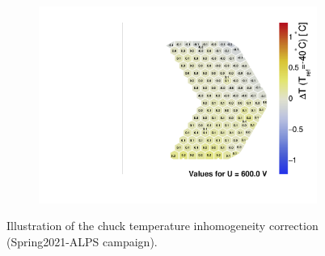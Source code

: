 \begin{figure}
\begin{subfigure}[b]{0.32\textwidth}
		\includegraphics[width=0.999\textwidth]{plots/chuck_temp_correction/Spring2021_ALPS_chucktempcorrected.pdf}
		\subcaption{
		}
		\label{plot:chucktemp_after}
	\end{subfigure}
	\caption{
		Illustration of the chuck temperature inhomogeneity correction (Spring2021-ALPS campaign).
	}
\end{figure}